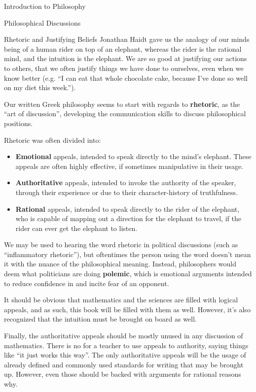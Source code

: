 \begin{chapter}{Introduction to Philosophy}
\begin{section}{Philosophical Discussions}
\begin{subsection}{Rhetoric and Justifying Beliefs}
            Jonathan Haidt gave us the analogy of our minds being of a human rider on top of an elephant, whereas the rider is the rational mind, and the intuition is the elephant. We are so good at justifying our actions to others, that we often justify things we have done to ourselves, even when we know better (e.g. ``I can eat that whole chocolate cake, because I've done so well on my diet this week.'').
                
            Our written Greek philosophy seems to start with regards to \textbf{rhetoric}, as the ``art of discussion'', developing the communication skills to discuss philosophical positions.
                
            Rhetoric was often divided into:
            \begin{itemize}
                \item \textbf{Emotional} appeals, intended to speak directly to the mind's elephant. These appeals are often highly effective, if sometimes manipulative in their usage.
                    
                \item \textbf{Authoritative} appeals, intended to invoke the authority of the speaker, through their experience or due to their character-history of truthfulness.
                    
                \item \textbf{Rational} appeals, intended to speak directly to the rider of the elephant, who is capable of mapping out a direction for the elephant to travel, if the rider can ever get the elephant to listen.
            \end{itemize}
                
            We may be used to hearing the word rhetoric in political discussions (such as ``inflammatory rhetoric''), but oftentimes the person using the word doesn't mean it with the nuance of the philosophical meaning. Instead, philosophers would deem what politicians are doing \textbf{polemic}, which is emotional arguments intended to reduce confidence in and incite fear of an opponent.
                
            It should be obvious that mathematics and the sciences are filled with logical appeals, and as such, this book will be filled with them as well. However, it's also recognized that the intuition must be brought on board as well. 
                
            Finally, the authoritative appeals should be mostly unused in any discussion of mathematics. There is no for a teacher to use appeals to authority, saying things like ``it just works this way''. The only authoritative appeals will be the usage of already defined and commonly used standards for writing that may be brought up. However, even those should be backed with arguments for rational reasons why.
                

\end{subsection}
\end{section}
\end{chapter}

